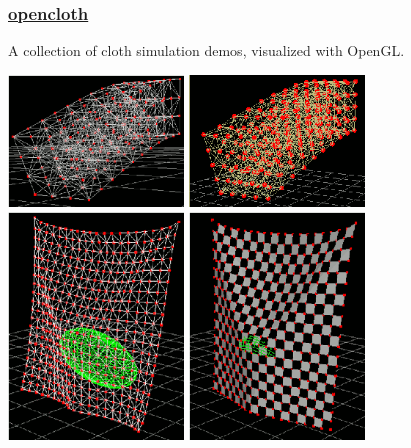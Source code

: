 \documentclass{scrartcl}
\numberwithin{figure}{subsection}
\begin{document}
\subsubsection{\href{https://github.com/mmmovania/opencloth}{opencloth}}

A collection of cloth simulation demos, visualized with OpenGL.

\begin{center}
  \includegraphics[width=0.35\textwidth]{opencloth1}
  \includegraphics[width=0.35\textwidth]{opencloth2}
  \includegraphics[width=0.35\textwidth]{opencloth3}
  \includegraphics[width=0.35\textwidth]{opencloth4}
\end{center}
\end{document}
